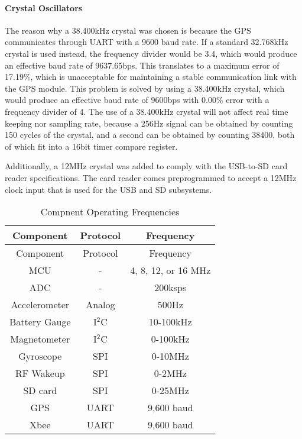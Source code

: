 \paragraph{Crystal Oscillators}
The reason why a 38.400kHz crystal was chosen is because the GPS communicates through UART with a 9600 baud rate. If a standard 32.768kHz crystal is used instead, the frequency divider would be 3.4, which would produce an effective baud rate of 9637.65bps. This translates to a maximum error of 17.19\%, which is unacceptable for maintaining a stable communication link with the GPS module. This problem is solved by using a 38.400kHz crystal, which would produce an effective baud rate of 9600bps with 0.00\% error with a frequency divider of 4. The use of a 38.400kHz crystal will not affect real time keeping nor sampling rate, because a 256Hz signal can be obtained by counting 150 cycles of the crystal, and a second can be obtained by counting 38400, both of which fit into a 16bit timer compare register.

Additionally, a 12MHz crystal was added to comply with the USB-to-SD card reader specifications. The card reader comes preprogrammed to accept a 12MHz clock input that is used for the USB and SD subsystems.

\begin{center}
    \begin{longtable}{|c|c|c|}
    \caption{Compnent Operating Frequencies  \label{tab:compFreq}} \\
     \hline
    \rowcolor{Gray}
   Component & Protocol & Frequency \\
    \hline \hline \endfirsthead
    
         \hline
    \rowcolor{Gray}
    Component & Protocol & Frequency\\
    \hline \hline \endhead
    
    \endfoot
    MCU   & -     & 4, 8, 12, or 16 MHz \\ \hline
    ADC   & -     & 200ksps \\ \hline %
    Accelerometer & Analog & 500Hz \\ \hline
    Battery Gauge & I$^2$C & 10-100kHz \\ \hline
    Magnetometer & I$^2$C & 0-100kHz \\ \hline
    Gyroscope & SPI   & 0-10MHz \\ \hline
    RF Wakeup & SPI   & 0-2MHz \\ \hline
    SD card & SPI   & 0-25MHz \\ \hline
    GPS   & UART  & 9,600 baud \\ \hline
    Xbee  & UART   & 9,600 baud \\ \hline
    \end{longtable}%

\end{center}%
  \vspace{-2cm}
  

